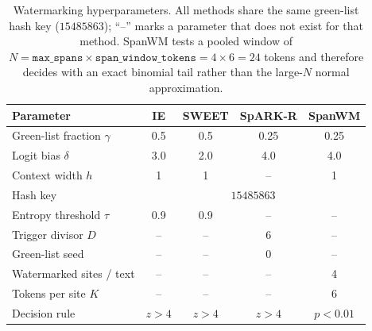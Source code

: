 \begin{table}[t]
\centering
\caption{Watermarking hyperparameters. All methods share the same green-list
hash key ($15485863$); ``--'' marks a parameter that does not exist for that
method. SpanWM tests a pooled window of
$N = \texttt{max\_spans} \times \texttt{span\_window\_tokens} = 4 \times 6 = 24$
tokens and therefore decides with an exact binomial tail rather than the
large-$N$ normal approximation.}
\label{tab:hyperparams}
\small
\begin{tabular}{@{}lcccc@{}}
\toprule
Parameter & IE & SWEET & SpARK-R & SpanWM \\
\midrule
Green-list fraction $\gamma$   & 0.5 & 0.5 & 0.25 & 0.25 \\
Logit bias $\delta$            & 3.0 & 2.0 & 4.0  & 4.0 \\
Context width $h$              & 1   & 1   & --   & 1 \\
Hash key                       & \multicolumn{4}{c}{$15485863$} \\
\addlinespace
Entropy threshold $\tau$       & 0.9 & 0.9 & --   & -- \\
Trigger divisor $D$            & --  & --  & 6    & -- \\
Green-list seed                & --  & --  & 0    & -- \\
Watermarked sites / text       & --  & --  & --   & 4 \\
Tokens per site $K$            & --  & --  & --   & 6 \\
\addlinespace
Decision rule                  & $z>4$ & $z>4$ & $z>4$ & $p<0.01$ \\
\bottomrule
\end{tabular}
\end{table}

